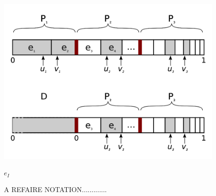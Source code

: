 \documentclass[./thesis.tex]{subfiles}
\begin{document}

\begin{figure}[h!]
	\begin{center}
		\includegraphics[width=0.9\columnwidth]{figures/pt2/move_to_deterministic}
		\caption{A REFAIRE NOTATION.............}
		\label{fig:move_to_deterministic}
		$e_I$
	\end{center}
\end{figure}
\end{document}
